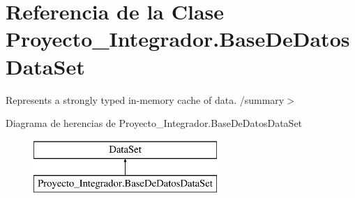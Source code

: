 \section{Referencia de la Clase Proyecto\-\_\-\-Integrador.\-Base\-De\-Datos\-Data\-Set}
\label{class_proyecto___integrador_1_1_base_de_datos_data_set}


Represents a strongly typed in-\/memory cache of data. /summary$>$  


Diagrama de herencias de Proyecto\-\_\-\-Integrador.\-Base\-De\-Datos\-Data\-Set\begin{figure}[H]
\begin{center}
\leavevmode
\includegraphics[height=2.000000cm]{class_proyecto___integrador_1_1_base_de_datos_data_set}
\end{center}
\end{figure}
